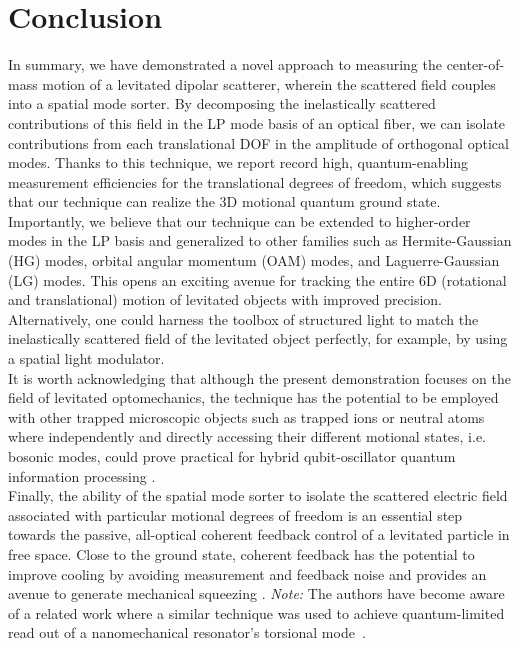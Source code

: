 \documentclass[%
 reprint,
 amsmath,amssymb,
 aps,
pra,
]{revtex4-2}
\begin{document}
\section{Conclusion}

In summary, we have demonstrated a novel approach to measuring the center-of-mass motion of a levitated dipolar scatterer, wherein the scattered field couples into a spatial mode sorter. By decomposing the inelastically scattered contributions of this field in the LP mode basis of an optical fiber, we can isolate contributions from each translational DOF in the amplitude of orthogonal optical modes. Thanks to this technique, we report record high, quantum-enabling measurement efficiencies for the translational degrees of freedom, which suggests that our technique can realize the 3D motional quantum ground state.
Importantly, we believe that our technique can be extended to higher-order modes in the LP basis and generalized to other families such as Hermite-Gaussian (HG) modes, orbital angular momentum (OAM) modes, and Laguerre-Gaussian (LG) modes. This opens an exciting avenue for tracking the entire 6D (rotational and translational) motion of levitated objects with improved precision. Alternatively, one could harness the toolbox of structured light to match the inelastically scattered field of the levitated object perfectly, for example, by using a spatial light modulator. \\
It is worth acknowledging that although the present demonstration focuses on the field of levitated optomechanics, the technique has the potential to be employed with other trapped microscopic objects such as trapped ions or neutral atoms where independently and directly accessing their different motional states, i.e. bosonic modes, could prove practical for hybrid qubit-oscillator quantum information processing \cite{fluhmann_encoding_2019, navickas_experimental_2024, liu_hybrid_2024}.\\
Finally, the ability of the spatial mode sorter to isolate the scattered electric field associated with particular motional degrees of freedom is an essential step towards the passive, all-optical coherent feedback control of a levitated particle in free space. Close to the ground state, coherent feedback has the potential to improve cooling by avoiding measurement and feedback noise \cite{ernzer_optical_2023} and provides an avenue to generate mechanical squeezing \cite{karg_remote_2019}.
\textit{Note: }The authors have become aware of a related work where a similar technique was used to achieve quantum-limited read out of a nanomechanical resonator's torsional mode~\cite{choi_quantum_limited_2024}.
\end{document}
